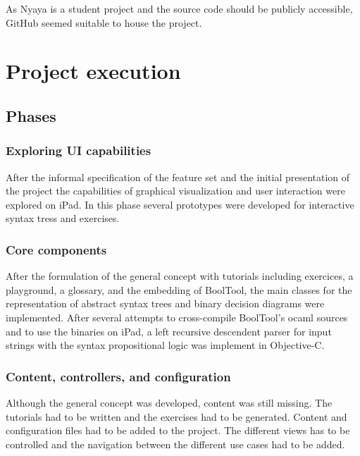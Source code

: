 As Nyaya is a student project and the source code should be publicly accessible,
GitHub seemed suitable to house the project.

\section{Project execution}

\subsection{Phases}

\subsubsection{Exploring UI capabilities}

After the informal specification of the feature set and the initial presentation of the project
the capabilities of graphical visualization and  user interaction were explored on iPad.
In this phase several prototypes were developed for interactive syntax tress and exercises.

\subsubsection{Core components}


After the formulation of the general concept with tutorials including exercices, a playground, a glossary, and the embedding of BoolTool,
the main classes for the representation of abstract syntax trees and binary decision diagrams were implemented.
After several attempts to cross-compile BoolTool's ocaml sources and to use the binaries on iPad, a left recursive descendent parser for input strings with the syntax propositional logic was implement in Objective-C. 

\subsubsection{Content, controllers, and configuration}

Although the general concept was developed, content was still missing. The tutorials had to be written and the exercises had to be generated. Content and configuration files had to be added to the project. 
The different views has to be controlled and the navigation between the different use cases had to be added. 

